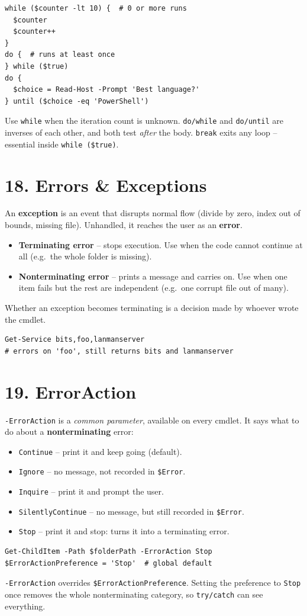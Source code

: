 \begin{verbatim}
while ($counter -lt 10) {  # 0 or more runs
  $counter
  $counter++
}
do {  # runs at least once
} while ($true)
do {
  $choice = Read-Host -Prompt 'Best language?'
} until ($choice -eq 'PowerShell')
\end{verbatim}
Use \texttt{while} when the iteration count is unknown. \texttt{do/while} and \texttt{do/until} are inverses of each other, and both test \emph{after} the body. \texttt{break} exits any loop -- essential inside \texttt{while (\$true)}.

\section{18. Errors \& Exceptions}
An \textbf{exception} is an event that disrupts normal flow (divide by zero, index out of bounds, missing file). Unhandled, it reaches the user as an \textbf{error}.
\begin{itemize}
\item \textbf{Terminating error} -- stops execution. Use when the code cannot continue at all (e.g.\ the whole folder is missing).
\item \textbf{Nonterminating error} -- prints a message and carries on. Use when one item fails but the rest are independent (e.g.\ one corrupt file out of many).
\end{itemize}
Whether an exception becomes terminating is a decision made by whoever wrote the cmdlet.
\begin{verbatim}
Get-Service bits,foo,lanmanserver
# errors on 'foo', still returns bits and lanmanserver
\end{verbatim}

\section{19. ErrorAction}
\texttt{-ErrorAction} is a \emph{common parameter}, available on every cmdlet. It says what to do about a \textbf{nonterminating} error:
\begin{itemize}
\item \texttt{Continue} -- print it and keep going (default).
\item \texttt{Ignore} -- no message, not recorded in \texttt{\$Error}.
\item \texttt{Inquire} -- print it and prompt the user.
\item \texttt{SilentlyContinue} -- no message, but still recorded in \texttt{\$Error}.
\item \texttt{Stop} -- print it and stop: turns it into a terminating error.
\end{itemize}
\begin{verbatim}
Get-ChildItem -Path $folderPath -ErrorAction Stop
$ErrorActionPreference = 'Stop'  # global default
\end{verbatim}
\texttt{-ErrorAction} overrides \texttt{\$ErrorActionPreference}. Setting the preference to \texttt{Stop} once removes the whole nonterminating category, so \texttt{try/catch} can see everything.

